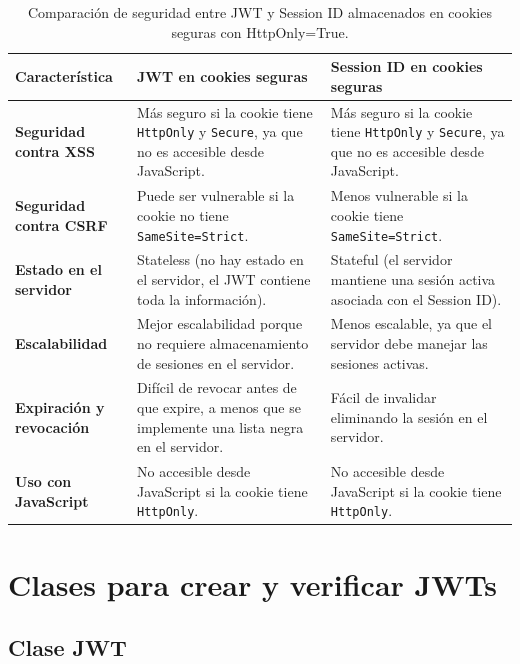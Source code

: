 \documentclass[a4paper,12pt]{report}
\begin{document}
			\FloatBarrier
			\begin{table}[h]
				\centering
				\begin{tabular}{|p{4cm}|p{5cm}|p{5cm}|}
					\hline
					\textbf{Característica} & \textbf{JWT en cookies seguras} & \textbf{Session ID en cookies seguras} \\
					\hline
					\textbf{Seguridad contra XSS} & Más seguro si la cookie tiene \texttt{HttpOnly} y \texttt{Secure}, ya que no es accesible desde JavaScript. & Más seguro si la cookie tiene \texttt{HttpOnly} y \texttt{Secure}, ya que no es accesible desde JavaScript. \\
					\hline
					\textbf{Seguridad contra CSRF} & Puede ser vulnerable si la cookie no tiene \texttt{SameSite=Strict}. & Menos vulnerable si la cookie tiene \texttt{SameSite=Strict}. \\
					\hline
					\textbf{Estado en el servidor} & Stateless (no hay estado en el servidor, el JWT contiene toda la información). & Stateful (el servidor mantiene una sesión activa asociada con el Session ID). \\
					\hline
					\textbf{Escalabilidad} & Mejor escalabilidad porque no requiere almacenamiento de sesiones en el servidor. & Menos escalable, ya que el servidor debe manejar las sesiones activas. \\
					\hline
					\textbf{Expiración y revocación} & Difícil de revocar antes de que expire, a menos que se implemente una lista negra en el servidor. & Fácil de invalidar eliminando la sesión en el servidor. \\
					\hline
					\textbf{Uso con JavaScript} & No accesible desde JavaScript si la cookie tiene \texttt{HttpOnly}. & No accesible desde JavaScript si la cookie tiene \texttt{HttpOnly}. \\
					\hline
				\end{tabular}
				\caption{Comparación de seguridad entre JWT y Session ID almacenados en cookies seguras con HttpOnly=True.}
				\label{tab:jwt_vs_session}
			\end{table}
			\FloatBarrier
	
		\pagebreak
		
		
		\section{Clases para crear y verificar JWTs}
		\label{sec:anexoCreacionYverificacionJWT}
	
	
\subsection{Clase JWT}
\end{document}
